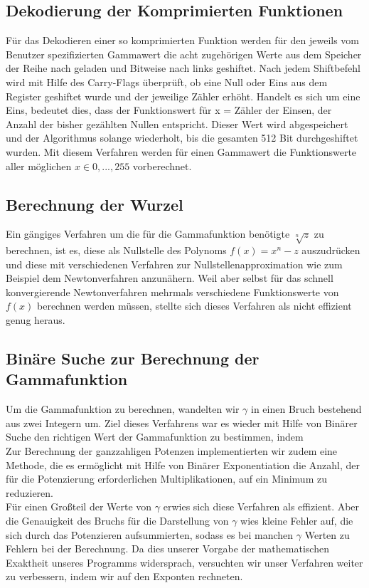 \documentclass[course=erap]{aspdoc}
\begin{document}
	\subsection{Dekodierung der Komprimierten Funktionen}
	Für das Dekodieren einer so komprimierten Funktion werden für den jeweils vom Benutzer spezifizierten Gammawert die acht zugehörigen Werte aus dem Speicher der Reihe nach geladen und Bitweise nach links geshiftet. Nach jedem Shiftbefehl wird mit Hilfe des Carry-Flags überprüft, ob eine Null oder Eins aus dem Register geshiftet wurde und der jeweilige Zähler erhöht. Handelt es sich um eine Eins, bedeutet dies, dass der Funktionswert für x = Zähler der Einsen, der Anzahl der bisher gezählten Nullen entspricht. Dieser Wert wird abgespeichert und der Algorithmus solange wiederholt, bis die gesamten 512 Bit durchgeshiftet wurden. Mit diesem Verfahren werden für einen Gammawert die Funktionswerte aller möglichen $x\in{0,...,255}$ vorberechnet.

	\subsection{Berechnung der Wurzel}
	Ein gängiges Verfahren um die für die Gammafunktion benötigte $\sqrt[n]{z}$ zu berechnen, ist es, diese als Nullstelle des Polynoms $f(x)=x^n-z$ auszudrücken und diese mit verschiedenen Verfahren zur Nullstellenapproximation wie zum Beispiel dem Newtonverfahren anzunähern. Weil aber selbst für das schnell konvergierende Newtonverfahren mehrmals verschiedene Funktionswerte von $f(x)$ berechnen werden müssen, stellte sich dieses Verfahren als nicht effizient genug heraus.     
	
	\subsection{Binäre Suche zur Berechnung der Gammafunktion}
	Um die Gammafunktion zu berechnen, wandelten wir  $\gamma$ in einen Bruch bestehend aus zwei Integern um. Ziel dieses Verfahrens war es wieder mit Hilfe von Binärer Suche den richtigen Wert der Gammafunktion zu bestimmen, indem %
	\\
	\newline
	\noindent	
	Zur Berechnung der ganzzahligen Potenzen implementierten wir zudem eine Methode, die es ermöglicht mit Hilfe von Binärer Exponentiation die Anzahl, der für die Potenzierung erforderlichen Multiplikationen, auf ein Minimum zu reduzieren. 
	\\
	\newline
	\noindent		 
	Für einen Großteil der Werte von $\gamma$ erwies sich diese Verfahren als effizient. Aber die Genauigkeit des Bruchs für die Darstellung von $\gamma$ wies kleine Fehler auf, die sich durch das Potenzieren aufsummierten, sodass es bei manchen $\gamma$ Werten zu Fehlern bei der Berechnung. Da dies unserer Vorgabe der mathematischen Exaktheit unseres Programms widersprach, versuchten wir unser Verfahren weiter zu verbessern, indem wir auf den Exponten rechneten.          
	
\end{document}

